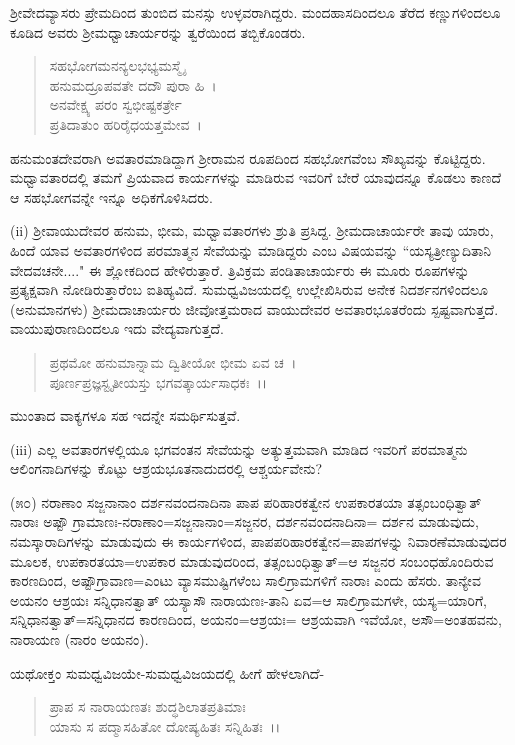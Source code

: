 ಶ‍್ರೀವೇದವ್ಯಾಸರು ಪ್ರೇಮದಿಂದ ತುಂಬಿದ ಮನಸ್ಸು ಉಳ್ಳವರಾಗಿದ್ದರು. ಮಂದಹಾಸದಿಂದಲೂ ತೆರೆದ ಕಣ್ಣುಗಳಿಂದಲೂ ಕೂಡಿದ ಅವರು ಶ‍್ರೀಮಧ್ವಾಚಾರ್ಯರನ್ನು ತ್ವರೆಯಿಂದ ತಬ್ಬಿಕೊಂಡರು.

\begin{verse}
ಸಹಭೋಗಮನನ್ಯಲಭಭ್ಯಮಸ್ಮೈ\\ ಹನುಮದ್ರೂಪವತೇ ದದೌ ಪುರಾ ಹಿ~।\\ ಅನವೇಕ್ಷ್ಯ ಪರಂ ಸ್ವಭೀಷ್ಟಕರ್ತ್ರೇ\\ ಪ್ರತಿದಾತುಂ ಹರಿರೈಧಯತ್ತಮೇವ~।
\end{verse}

ಹನುಮಂತದೇವರಾಗಿ ಅವತಾರಮಾಡಿದ್ದಾಗ ಶ‍್ರೀರಾಮನ ರೂಪದಿಂದ ಸಹಭೋಗವೆಂಬ ಸೌಖ್ಯವನ್ನು ಕೊಟ್ಟಿದ್ದರು. ಮಧ್ವಾವತಾರದಲ್ಲಿ ತಮಗೆ ಪ್ರಿಯವಾದ ಕಾರ್ಯಗಳನ್ನು ಮಾಡಿರುವ ಇವರಿಗೆ ಬೇರೆ ಯಾವುದನ್ನೂ ಕೊಡಲು ಕಾಣದೆ ಆ ಸಹಭೋಗವನ್ನೇ ಇನ್ನೂ ಅಧಿಕಗೊಳಿಸಿದರು.

(ii) ಶ‍್ರೀವಾಯುದೇವರ ಹನುಮ, ಭೀಮ, ಮಧ್ವಾವತಾರಗಳು ಶ್ರುತಿ ಪ್ರಸಿದ್ದ. ಶ‍್ರೀಮದಾಚಾರ್ಯರೇ ತಾವು ಯಾರು, ಹಿಂದೆ ಯಾವ ಅವತಾರಗಳಿಂದ ಪರಮಾತ್ಮನ ಸೇವೆಯನ್ನು ಮಾಡಿದ್ದರು ಎಂಬ ವಿಷಯವನ್ನು ``ಯಸ್ಯತ್ರೀಣ್ಯುದಿತಾನಿ ವೇದವಚನೇ...." ಈ ಶ್ಲೋಕದಿಂದ ಹೇಳಿರುತ್ತಾರೆ. ತ್ರಿವಿಕ್ರಮ ಪಂಡಿತಾಚಾರ್ಯರು ಈ ಮೂರು ರೂಪಗಳನ್ನು ಪ್ರತ್ಯಕ್ಷವಾಗಿ ನೋಡಿರುತ್ತಾರೆಂಬ ಐತಿಹ್ಯವಿದೆ. ಸುಮಧ್ವವಿಜಯದಲ್ಲಿ ಉಲ್ಲೇಖಿಸಿರುವ ಅನೇಕ ನಿದರ್ಶನಗಳಿಂದಲೂ (ಅನುಮಾನಗಳು) ಶ‍್ರೀಮದಾಚಾರ್ಯರು ಜೀವೋತ್ತಮರಾದ ವಾಯುದೇವರ ಅವತಾರಭೂತರೆಂದು ಸ್ಪಷ್ಟವಾಗುತ್ತದೆ. ವಾಯುಪುರಾಣದಿಂದಲೂ ಇದು ವೇದ್ಯವಾಗುತ್ತದೆ.

\begin{verse}
 ಪ್ರಥಮೋ ಹನುಮಾನ್ನಾಮ ದ್ವಿತೀಯೋ ಭೀಮ ಏವ ಚ~।\\ ಪೂರ್ಣಪ್ರಜ್ಞಸ್ಟೃತೀಯಸ್ತು ಭಗವತ್ಕಾರ್ಯಸಾಧಕಃ~।।
\end{verse}

\noindent
ಮುಂತಾದ ವಾಕ್ಯಗಳೂ ಸಹ ಇದನ್ನೇ ಸಮರ್ಥಿಸುತ್ತವೆ.

(iii) ಎಲ್ಲ ಅವತಾರಗಳಲ್ಲಿಯೂ ಭಗವಂತನ ಸೇವೆಯನ್ನು ಅತ್ಯುತ್ತಮವಾಗಿ ಮಾಡಿದ ಇವರಿಗೆ ಪರಮಾತ್ಮನು ಆಲಿಂಗನಾದಿಗಳನ್ನು ಕೊಟ್ಟು ಆಶ್ರಯಭೂತನಾದುದರಲ್ಲಿ ಆಶ್ಚರ್ಯವೇನು?

(೫೦) ನರಾಣಾಂ ಸಜ್ಜನಾನಾಂ ದರ್ಶನವಂದನಾದಿನಾ ಪಾಪ ಪರಿಹಾರಕತ್ವೇನ ಉಪಕಾರತಯಾ ತತ್ಸಂಬಂಧಿತ್ವಾತ್ ನಾರಾಃ ಅಷ್ಟೌ ಗ್ರಾಮಾಣಃ-ನರಾಣಾಂ=ಸಜ್ಜನಾನಾಂ=ಸಜ್ಜನರ, ದರ್ಶನವಂದನಾದಿನಾ= ದರ್ಶನ ಮಾಡುವುದು, ನಮಸ್ಕಾರಾದಿಗಳನ್ನು ಮಾಡುವುದು ಈ ಕಾರ್ಯಗಳಿಂದ, ಪಾಪಪರಿಹಾರಕತ್ವೇನ=ಪಾಪಗಳನ್ನು ನಿವಾರಣೆಮಾಡುವುದರ ಮೂಲಕ, ಉಪಕಾರತಯಾ=ಉಪಕಾರ ಮಾಡುವುದರಿಂದ, ತತ್ಸಂಬಂಧಿತ್ವಾತ್=ಆ ಸಜ್ಜನರ ಸಂಬಂಧಹೊಂದಿರುವ ಕಾರಣದಿಂದ, ಅಷ್ಟೌಗ್ರಾವಾಣ=ಎಂಟು ವ್ಯಾಸಮುಷ್ಟಿಗಳೆಂಬ ಸಾಲಿಗ್ರಾಮಗಳಿಗೆ ನಾರಾಃ ಎಂದು ಹೆಸರು. ತಾನ್ಯೇವ ಅಯನಂ ಆಶ್ರಯಃ ಸನ್ನಿಧಾನತ್ವಾತ್ ಯಸ್ಯಾಸೌ ನಾರಾಯಣಃ-ತಾನಿ ಏವ=ಆ ಸಾಲಿಗ್ರಾಮಗಳೇ, ಯಸ್ಯ=ಯಾರಿಗೆ, ಸನ್ನಿಧಾನತ್ವಾತ್=ಸನ್ನಿಧಾನದ ಕಾರಣದಿಂದ, ಅಯನಂ=ಆಶ್ರಯಃ= ಆಶ್ರಯವಾಗಿ ಇವೆಯೋ, ಅಸೌ=ಅಂತಹವನು, ನಾರಾಯಣ (ನಾರಂ ಅಯನಂ).

ಯಥೋಕ್ತಂ ಸುಮಧ್ವವಿಜಯೇ-ಸುಮಧ್ವವಿಜಯದಲ್ಲಿ ಹೀಗೆ ಹೇಳಲಾಗಿದೆ-

\begin{verse}
ಪ್ರಾಪ ಸ ನಾರಾಯಣತಃ ಶುದ್ಧಶಿಲಾತಪ್ರತಿಮಾಃ \\ ಯಾಸು ಸ ಪದ್ಮಾಸಹಿತೋ ದೋಷ್ಯಹಿತಃ ಸನ್ನಿಹಿತಃ~।।
\end{verse}


